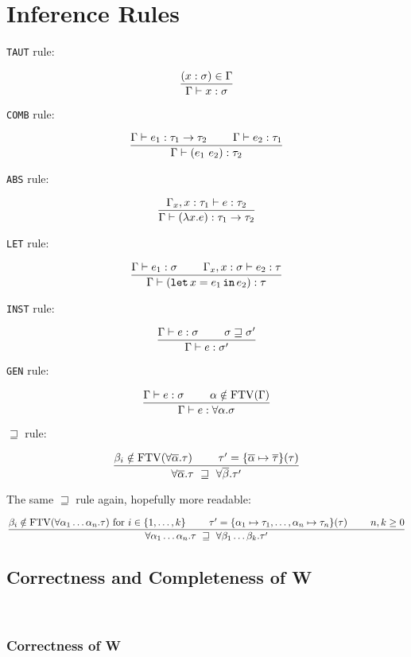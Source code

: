 \documentclass[a4paper,oneside]{memoir}
\begin{document}
\section{Inference Rules}

\texttt{TAUT} rule:

$$\dfrac{(x : \sigma) \in \Gamma}{ \Gamma \vdash x : \sigma}$$

\texttt{COMB} rule:

$$\dfrac{\Gamma \vdash e_1 : \tau_1 \rightarrow \tau_2 ~ ~ ~ ~ ~ ~ ~ \Gamma \vdash e_2 : \tau_1}{\Gamma \vdash (e_1~e_2) : \tau_2}$$

\texttt{ABS} rule:

$$\dfrac{\Gamma_x,x:\tau_1 \vdash e : \tau_2}{\Gamma \vdash (\lambda x . e) :  \tau_1 \rightarrow \tau_2}$$

\texttt{LET} rule:

$$\dfrac{\Gamma \vdash e_1 : \sigma ~ ~ ~ ~ ~ ~ ~ \Gamma_x,x:\sigma \vdash e_2 : \tau}{\Gamma \vdash (\texttt{let} \, x = e_1 \, \texttt{in} \, e_2) :  \tau}$$

\texttt{INST} rule:

$$\dfrac{\Gamma \vdash e : \sigma ~ ~ ~ ~ ~ ~ ~ \sigma \sqsupseteq \sigma^\prime}{\Gamma \vdash e : \sigma^\prime}$$

\texttt{GEN} rule:

$$\dfrac{\Gamma \vdash e : \sigma ~ ~ ~ ~ ~ ~ ~ \alpha \notin \operatorname{FTV}(\Gamma)}{\Gamma \vdash e : \forall \alpha . \sigma}$$

$\sqsupseteq$ rule:

$$\dfrac{\beta_i \notin \operatorname{FTV}(\forall \overline{\alpha}.\tau) ~ ~ ~ ~ ~ ~ ~ \tau^\prime = \{\overline{\alpha} \mapsto \overline{\tau}\}(\tau)}{\forall \overline{\alpha}.\tau  ~ \sqsupseteq ~   \forall \overline{\beta}.\tau^\prime}$$

The same $\sqsupseteq$ rule again, hopefully more readable:

$$\dfrac{\beta_i \notin \operatorname{FTV}(\forall \alpha_1\dots\alpha_n.\tau) \text{ for } i \in \{1,\dots,k\} ~ ~ ~ ~ ~ ~ ~ \tau^\prime = \{ \alpha_1 \mapsto \tau_1,  \dots, \alpha_n \mapsto \tau_n \}(\tau) ~ ~ ~ ~ ~ ~ ~ n,k \geq 0}{\forall \alpha_1\dots\alpha_n.\tau  ~ \sqsupseteq ~   \forall \beta_1\dots\beta_k.\tau^\prime}$$




\subsection{Correctness and Completeness of W}

~

\subsubsection{Correctness of W}
\end{document}
